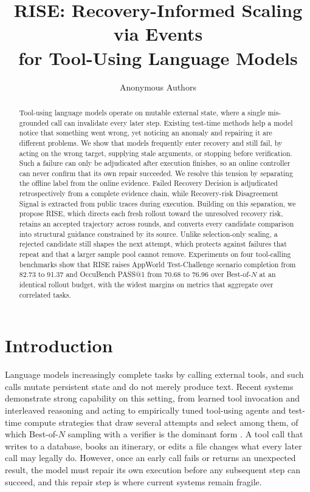 \documentclass{article}
\title{RISE: Recovery-Informed Scaling via Events\\for Tool-Using Language Models}
\author{Anonymous Authors}
\newcommand{\method}{RISE\xspace}
\begin{document}
\maketitle

\begin{abstract}
Tool-using language models operate on mutable external state, where a single mis-grounded call can invalidate every later step. Existing test-time methods help a model notice that something went wrong, yet noticing an anomaly and repairing it are different problems. We show that models frequently enter recovery and still fail, by acting on the wrong target, supplying stale arguments, or stopping before verification. Such a failure can only be adjudicated after execution finishes, so an online controller can never confirm that its own repair succeeded. We resolve this tension by separating the offline label from the online evidence. Failed Recovery Decision is adjudicated retrospectively from a complete evidence chain, while Recovery-risk Disagreement Signal is extracted from public traces during execution. Building on this separation, we propose \method, which directs each fresh rollout toward the unresolved recovery risk, retains an accepted trajectory across rounds, and converts every candidate comparison into structural guidance constrained by its source. Unlike selection-only scaling, a rejected candidate still shapes the next attempt, which protects against failures that repeat and that a larger sample pool cannot remove. Experiments on four tool-calling benchmarks show that \method raises AppWorld Test-Challenge scenario completion from 82.73 to 91.37 and OccuBench PASS@1 from 70.68 to 76.96 over \mbox{Best-of-$N$} at an identical rollout budget, with the widest margins on metrics that aggregate over correlated tasks.
\end{abstract}

\section{Introduction}

Language models increasingly complete tasks by calling external tools, and such calls mutate persistent state and do not merely produce text. Recent systems demonstrate strong capability on this setting, from learned tool invocation \citep{schick2023toolformer} and interleaved reasoning and acting \citep{yao2023react} to empirically tuned tool-using agents \citep{oagents2025} and test-time compute strategies that draw several attempts and select among them, of which \mbox{Best-of-$N$} sampling with a verifier is the dominant form \citep{snell2025scaling,oppo_tts2025}. A tool call that writes to a database, books an itinerary, or edits a file changes what every later call may legally do. However, once an early call fails or returns an unexpected result, the model must repair its own execution before any subsequent step can succeed, and this repair step is where current systems remain fragile.
\end{document}
